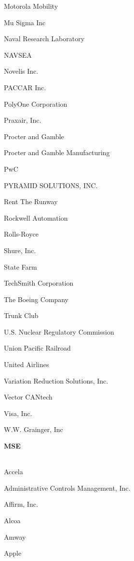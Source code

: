 \documentclass[twoside]{article}
\begin{document}
\begin{center}
\begin{multicols}{5}
\begin{FlushLeft}
\begin{compactitem}
\item Motorola Mobility
\item Mu Sigma Inc
\item Naval Research Laboratory
\item NAVSEA
\item Novelis Inc.
\item PACCAR Inc.
\item PolyOne Corporation
\item Praxair, Inc.
\item Procter and Gamble
\item Procter and Gamble Manufacturing
\item PwC
\item PYRAMID SOLUTIONS, INC.
\item Rent The Runway
\item Rockwell Automation
\item Rolls-Royce
\item Shure, Inc.
\item State Farm
\item TechSmith Corporation
\item The Boeing Company
\item Trunk Club
\item U.S. Nuclear Regulatory Commission
\item Union Pacific Railroad
\item United Airlines
\item Variation Reduction Solutions, Inc.
\item Vector CANtech
\item Visa, Inc.
\item W.W. Grainger, Inc
\end{compactitem}
        \end{FlushLeft}
        \vspace{1em}
        {\fontsize{14}{16}\selectfont \bf MSE}\\
        \vspace{-1em}
        ~\hrulefill~
        \vspace{-.9em}
        \begin{FlushLeft}
        \begin{compactitem}
        \item Accela
\item Administrative Controls Management, Inc.
\item Affirm, Inc.
\item Alcoa
\item Amway
\item Apple

\end{compactitem}
\end{FlushLeft}
\end{multicols}
\end{center}
\end{document}
